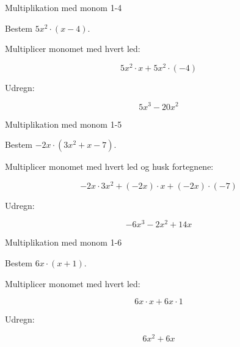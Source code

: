\documentclass{article}
\begin{document}
\newpage

\begin{exercise}{Multiplikation med monom 1-4}

Bestem $5x^2 \cdot (x - 4)$.


\hint

Multiplicer monomet med hvert led:

\hint
\[
5x^2 \cdot x + 5x^2 \cdot (-4)
\]

\hint

Udregn:

\hint
\[
5x^3 - 20x^2
\]

\end{exercise}

\newpage

\begin{exercise}{Multiplikation med monom 1-5}

Bestem $-2x \cdot (3x^2 + x - 7)$.


\hint

Multiplicer monomet med hvert led og husk fortegnene:

\hint
\[
-2x \cdot 3x^2 + (-2x) \cdot x + (-2x) \cdot (-7)
\]

\hint

Udregn:

\hint
\[
-6x^3 - 2x^2 + 14x
\]

\end{exercise}

\newpage

\begin{exercise}{Multiplikation med monom 1-6}

Bestem $6x \cdot (x + 1)$.


\hint

Multiplicer monomet med hvert led:

\hint
\[
6x \cdot x + 6x \cdot 1
\]

\hint

Udregn:

\hint
\[
6x^2 + 6x
\]

\end{exercise}
\end{document}
